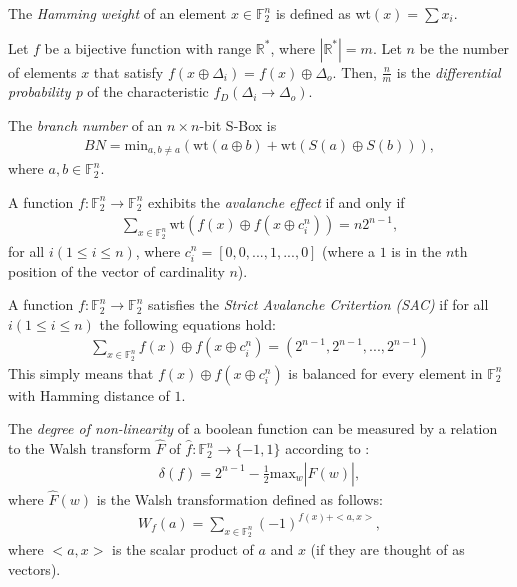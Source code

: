 \documentclass[11pt]{article}
\newcommand{\field}[1]{\mathbb{#1}} %
\begin{document}

\begin{define}
The \emph{Hamming weight} of an element $x \in \field{F}_2^n$ is defined as wt$(x) = \sum x_i$.
\end{define}

\begin{define}
Let $f$ be a bijective function with range $\mathbb{R^*}$, where $|\mathbb{R^*}| = m$. Let $n$ be the number of elements $x$ that satisfy $f(x \oplus \Delta_i) = f(x) \oplus \Delta_o$. Then, $\frac{n}{m}$ is the \emph{differential probability p} of the characteristic $f_D(\Delta_i \to \Delta_o)$.
\end{define}

\begin{define}
The \emph{branch number} of an $n \times n$-bit S-Box is
\begin{eqnarray*}
BN = \text{min}_{a, b\not=a}(\text{wt}(a \oplus b) + \text{wt}(S(a) \oplus S(b))),
\end{eqnarray*}
where $a, b \in \field{F}_2^n$.
\end{define}

\begin{define}
A function $f : \field{F}_2^n \to \field{F}_2^n$ exhibits the \emph{avalanche effect} if and only if 
\begin{eqnarray*}
\sum_{x \in \field{F}_2^n} \text{wt}(f(x) \oplus f(x \oplus c_{i}^{n})) = n2^{n-1},
\end{eqnarray*}
for all $i (1 \leq i \leq n)$, where $c_{i}^{n} = [0, 0, ..., 1, ..., 0]$ (where a $1$ is in the $n$th position of the vector of cardinality $n$).
\end{define}

\begin{define}
A function $f : \field{F}_2^n \to \field{F}_2^n$ satisfies the \emph{Strict Avalanche Critertion (SAC)} if for all $i (1 \leq i \leq n)$ the following equations hold:
\begin{eqnarray*}
\sum_{x \in \field{F}_2^n} f(x) \oplus f(x \oplus c_i^n) = (2^{n-1}, 2^{n-1}, ..., 2^{n-1})
\end{eqnarray*}
This simply means that $f(x) \oplus f(x \oplus c_i^n)$ is balanced for every element in $\field{F}_2^n$ with Hamming distance of $1$. 
\end{define}

\begin{define}
The \emph{degree of non-linearity} of a boolean function can be measured by a relation to the Walsh transform $\hat{F}$ of $\hat{f} : \field{F}_2^n \to \{-1, 1\}$ according to \cite{Kim90astudy}:
\begin{eqnarray*}
\delta(f)  = 2^{n-1} - \frac{1}{2}\text{max}_w|\hat{F}(w)|,
\end{eqnarray*}
where $\hat{F}(w)$ is the Walsh transformation defined as follows:
\begin{eqnarray*}
W_f(a) = \sum_{x \in \field{F}_2^n} (-1)^{f(x) + <a,x>},
\end{eqnarray*}
where $<a,x>$ is the scalar product of $a$ and $x$ (if they are thought of as vectors).
\end{define}
\end{document}

